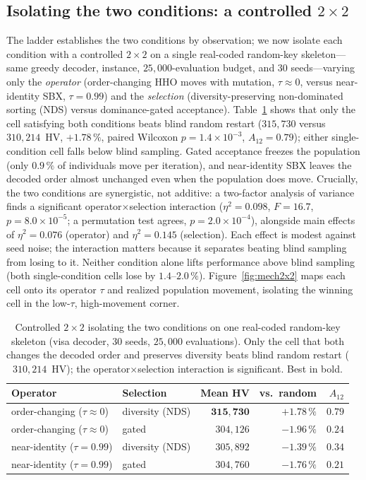 \documentclass[runningheads]{llncs}
\newcommand{\HV}{\textsf{HV}}
\begin{document}
\subsection{Isolating the two conditions: a controlled $2\times2$}
\label{sec:twoconditions}
The ladder establishes the two conditions by observation; we now isolate each condition with a controlled $2\times2$ on a single real-coded random-key skeleton---same greedy decoder, instance, $25{,}000$-evaluation budget, and 30 seeds---varying only the \emph{operator} (order-changing HHO moves with mutation, $\tau\!\approx\!0$, versus near-identity SBX, $\tau\!=\!0.99$) and the \emph{selection} (diversity-preserving non-dominated sorting (NDS) versus dominance-gated acceptance). Table~\ref{tab:factorial2x2} shows that only the cell satisfying both conditions beats blind random restart ($315{,}730$ versus $310{,}214$~\HV, $+1.78\,\%$, paired Wilcoxon $p=1.4\times10^{-3}$, $A_{12}=0.79$); either single-condition cell falls below blind sampling. Gated acceptance freezes the population (only $0.9\,\%$ of individuals move per iteration), and near-identity SBX leaves the decoded order almost unchanged even when the population does move. Crucially, the two conditions are synergistic, not additive: a two-factor analysis of variance finds a significant operator$\times$selection interaction ($\eta^2=0.098$, $F=16.7$, $p=8.0\times10^{-5}$; a permutation test agrees, $p=2.0\times10^{-4}$), alongside main effects of $\eta^2=0.076$ (operator) and $\eta^2=0.145$ (selection). Each effect is modest against seed noise; the interaction matters because it separates beating blind sampling from losing to it. Neither condition alone lifts performance above blind sampling (both single-condition cells lose by $1.4$--$2.0\,\%$). Figure~\ref{fig:mech2x2} maps each cell onto its operator $\tau$ and realized population movement, isolating the winning cell in the low-$\tau$, high-movement corner. 

\begin{table}[t]
\centering
\caption{Controlled $2\times2$ isolating the two conditions on one real-coded random-key skeleton (visa decoder, 30 seeds, $25{,}000$ evaluations). Only the cell that both changes the decoded order and preserves diversity beats blind random restart ($310{,}214$~\HV); the operator$\times$selection interaction is significant. Best in bold.}
\label{tab:factorial2x2}
\small
\begin{tabular}{llrrr}
\toprule
\textbf{Operator} & \textbf{Selection} & \textbf{Mean \HV} & \textbf{vs.\ random} & \textbf{$A_{12}$}\\
\midrule
order-changing ($\tau\!\approx\!0$) & diversity (NDS) & $\mathbf{315{,}730}$ & $\mathbf{+1.78\,\%}$ & $\mathbf{0.79}$\\
order-changing ($\tau\!\approx\!0$) & gated            & $304{,}126$ & $-1.96\,\%$ & $0.24$\\
near-identity ($\tau\!=\!0.99$)     & diversity (NDS) & $305{,}892$ & $-1.39\,\%$ & $0.34$\\
near-identity ($\tau\!=\!0.99$)     & gated            & $304{,}760$ & $-1.76\,\%$ & $0.21$\\
\bottomrule
\end{tabular}
\end{table}
\end{document}
